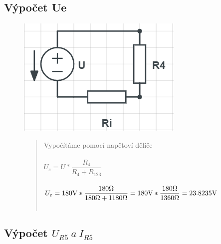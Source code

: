 \subsection{Výpočet Ue}

\begin{figure}[H]
    \centering
    \includegraphics[scale=0.9]{pic2/u2o3.5.png}
    \begin{quote}
        \centering
	    Vypočítáme pomocí napětoví děliče \\~\\ 
	    $U_e = U * \dfrac{R_4}{R_4 + R_{123}} $ \\~\\
	    $U_e = 180\Vo * \dfrac{180\Omega}{180\Omega + 1180\Omega}  = 
	    180\Vo * \dfrac{180\Omega}{1360\Omega} = 23.8235\Vo$ \\~\\
	   
    \end{quote}
\end{figure}

\subsection{Výpočet $U_{R5} \: a \: I_{R5}$}

